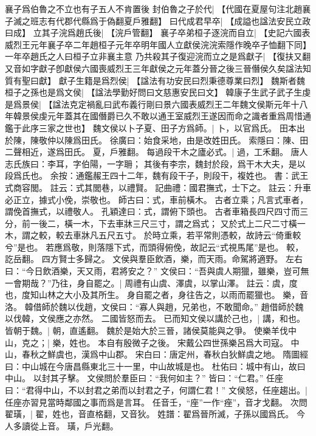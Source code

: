 襄子爲伯魯之不立也有子五人不肯置後
封伯魯之子於代|{
	【代國在夏屋句注北趙襄子滅之班志有代郡代縣爲于偽翻夏戶雅翻】}
曰代成君早卒|{
	【成謚也諡法安民立政曰成】}
立其子浣爲趙氏後|{
	【浣戶管翻】}
襄子卒弟桓子逐浣而自立|{
	【史記六國表威烈王元年襄子卒二年趙桓子元年卒明年國人立獻侯浣浣索隱作晚卒子恤翻下同】}
一年卒趙氏之人曰桓子立非襄主意
乃共殺其子復迎浣而立之是爲獻子|{
	【復扶又翻又音如字獻子卽獻侯六國喪威烈王三年獻侯之元年蓋分晉之後三晉僭侯久矣諡法知質有聖曰獻】}
獻子生籍是爲烈侯|{
	【諡法有功安民曰烈秉德尊業曰烈】}
魏斯者魏桓子之孫也是爲文侯|{
	【諡法學勤好問曰文慈惠安民曰文】}
韓康子生武子武子生虔是爲景侯|{
	【諡法克定禍亂曰武布義行剛曰景六國表威烈王二年魏文侯斯元年十八年韓景侯虔元年蓋其在國僭爵已久不敢以通王室威烈王遂因而命之識者重爲周惜通鑑于此序三家之世也】}
魏文侯以卜子夏、田子方爲師。|{
	卜，以官爲氏。
	田本出於陳，陳敬仲以陳爲田氏。
	徐廣曰：始食采地，由是改姓田氏。
	索隱曰：陳、田二聲相近，遂爲田氏。
	夏，戶雅翻。
	}
每過段干木之廬必式。|{
	過，工禾翻。
	唐人志氏族曰：李耳，字伯陽，一字耼；
	其後有李宗，魏封於段，爲干木大夫，是以段爲氏也。
	余按：通鑑赧王四十二年，魏有段干子，則段干，複姓也。
	書：武王式商容閭。
	註云：式其閭巷，以禮賢。
	記曲禮：國君撫式，士下之。
	註云：升車必正立，據式小俛，崇敬也。
	師古曰：式，車前橫木。
	古者立乘；凡言式車者，謂俛首撫式，以禮敬人。
	孔穎達曰：式，謂俯下頭也。
	古者車箱長四尺四寸而三分，前一後二，橫一木，下去車牀三尺三寸，謂之爲式；
	又於式上二尺二寸橫一木，謂之較，較去車牀凡五尺五寸。
	於時立乘，若平常則憑較，故詩云“倚重較兮”是也。
	若應爲敬，則落隱下式，而頭得俯俛，故記云“式視馬尾”是也。
	較，訖岳翻。
	}
四方賢士多歸之。
文侯與羣臣飲酒，樂，而天雨。命駕將適野。
左右曰：“今日飲酒樂，天又雨，君將安之？”
文侯曰：“吾與虞人期獵，雖樂，豈可無一會期哉？”乃往，身自罷之。|{
	周禮有山虞、澤虞，以掌山澤。
	註云：虞，度也，度知山林之大小及其所生。
	身自罷之者，身往告之，以雨而罷獵也。
	樂，音洛。
	}
韓借師於魏以伐趙，文侯曰：“寡人與趙，兄弟也，不敢聞命。”
趙借師於魏以伐韓，文侯應之亦然。
二國皆怒而去。
已而知文侯以講於己也，|{
	講，和也。
	}
皆朝于魏。|{
	朝，直遙翻。
	}
魏於是始大於三晉，諸侯莫能與之爭。
使樂羊伐中山，克之；|{
	樂，姓也。
	本自有殷微子之後。
	宋戴公四世孫樂呂爲大司寇。
	中山，春秋之鮮虞也，漢爲中山郡。
	宋白曰：唐定州，春秋白狄鮮虞之地。
	隋圖經曰：中山城在今唐昌縣東北三十一里，中山故城是也。
	杜佑曰：城中有山，故曰中山。
	}
以封其子擊。
文侯問於羣臣曰：“我何如主？”
皆曰：“仁君。”
任座曰：“君得中山，不以封君之弟而以封君之子，何謂仁君！”
文侯怒，任座趨出。|{
	任座亦習見當時鄰國之事而爲是言耳。
	任音壬，“座”一作“痤”，音才戈翻。
	}
次問翟璜，|{
	翟，姓也，音直格翻，又音狄。
	姓譜：翟爲晉所滅，子孫以國爲氏。
	今人多讀從上音。
	璜，戶光翻。
	}
